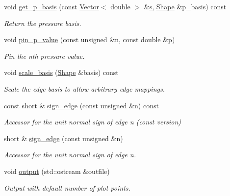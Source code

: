\begin{DoxyCompactItemize}
void \hyperlink{classoomph_1_1TPoroelasticityElement_a4f319ec9f7c2ce3cb871c060d35bc5e3}{get\+\_\+p\+\_\+basis} (const \hyperlink{classoomph_1_1Vector}{Vector}$<$ double $>$ \&\hyperlink{cfortran_8h_ab7123126e4885ef647dd9c6e3807a21c}{s}, \hyperlink{classoomph_1_1Shape}{Shape} \&p\+\_\+basis) const
\begin{DoxyCompactList}\small\item\em Return the pressure basis. \end{DoxyCompactList}\item 
void \hyperlink{classoomph_1_1TPoroelasticityElement_a0f5b5101a7e1a8a0dd6ac42eb53c037e}{pin\+\_\+p\+\_\+value} (const unsigned \&n, const double \&p)
\begin{DoxyCompactList}\small\item\em Pin the nth pressure value. \end{DoxyCompactList}\item 
void \hyperlink{classoomph_1_1TPoroelasticityElement_a46bdd198a1675b743674964c79396db1}{scale\+\_\+basis} (\hyperlink{classoomph_1_1Shape}{Shape} \&basis) const
\begin{DoxyCompactList}\small\item\em Scale the edge basis to allow arbitrary edge mappings. \end{DoxyCompactList}\item 
const short \& \hyperlink{classoomph_1_1TPoroelasticityElement_ae409fa6246d5aa0e70220dbfd5e69efe}{sign\+\_\+edge} (const unsigned \&n) const
\begin{DoxyCompactList}\small\item\em Accessor for the unit normal sign of edge n (const version) \end{DoxyCompactList}\item 
short \& \hyperlink{classoomph_1_1TPoroelasticityElement_a01c19cf3bcfbf7fb986f20ba4711a951}{sign\+\_\+edge} (const unsigned \&n)
\begin{DoxyCompactList}\small\item\em Accessor for the unit normal sign of edge n. \end{DoxyCompactList}\item 
void \hyperlink{classoomph_1_1TPoroelasticityElement_a3912efeb340ac4391ace351b4fe616c3}{output} (std\+::ostream \&outfile)
\begin{DoxyCompactList}\small\item\em Output with default number of plot points. \end{DoxyCompactList}\item 

\end{DoxyCompactItemize}
